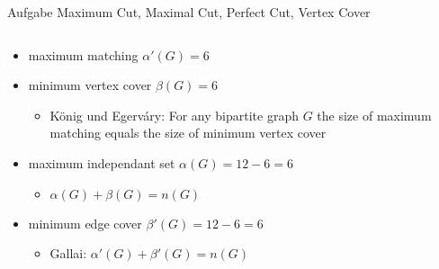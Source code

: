 \begin{frame}[allowframebreaks]{Aufgabe \thesection}{Maximum Cut, Maximal Cut, Perfect Cut, Vertex Cover}
  \begin{solution}
  \end{solution}
  \begin{solution}
    \begin{columns}
      \begin{column}{0.5\textwidth}
        \begin{itemize}
          \item maximum matching $\alpha'(G) = 6$
          \item minimum vertex cover $\beta(G) = 6$
          \begin{itemize}
            \item \alert{König und Egerváry:} For any bipartite graph $G$ the size of maximum matching equals the size of minimum vertex cover
          \end{itemize}
          \item maximum independant set $\alpha(G) = 12 - 6 = 6$ 
          \begin{itemize}
            \item $\alpha(G) + \beta(G) = n(G)$
          \end{itemize}
          \item minimum edge cover $\beta'(G) = 12 - 6 = 6$
          \begin{itemize}
            \item \alert{Gallai:} $\alpha'(G) + \beta'(G) = n(G)$
          \end{itemize}
        \end{itemize}
      \end{column}
      \begin{column}{0.5\textwidth}
      \end{column}
    \end{columns}
  \end{solution}
  \begin{solutionnoinc}
  \end{solutionnoinc}
  \begin{solution}
  \end{solution}
\end{frame}
